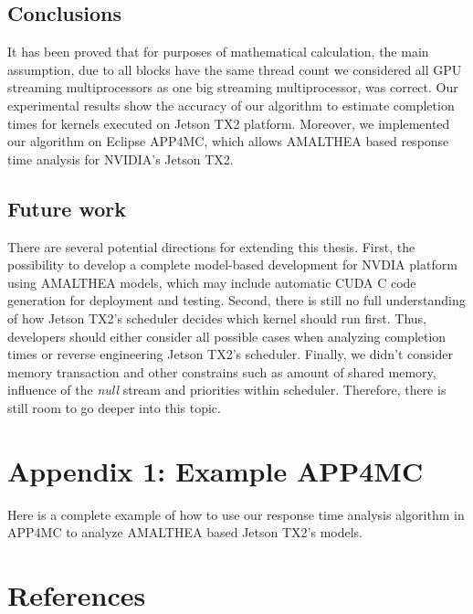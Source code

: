 \documentclass[
  12pt,
  a4paperpaper,
]{report}
\begin{document}
\hypertarget{conclusions}{%
\section{Conclusions}\label{conclusions}}

It has been proved that for purposes of mathematical calculation, the
main assumption, due to all blocks have the same thread count we
considered all GPU streaming multiprocessors as one big streaming
multiprocessor, was correct. Our experimental results show the accuracy
of our algorithm to estimate completion times for kernels executed on
Jetson TX2 platform. Moreover, we implemented our algorithm on Eclipse
APP4MC, which allows AMALTHEA based response time analysis for NVIDIA's
Jetson TX2.

\hypertarget{future-work}{%
\section{Future work}\label{future-work}}

There are several potential directions for extending this thesis. First,
the possibility to develop a complete model-based development for NVDIA
platform using AMALTHEA models, which may include automatic CUDA C code
generation for deployment and testing. Second, there is still no full
understanding of how Jetson TX2's scheduler decides which kernel should
run first. Thus, developers should either consider all possible cases
when analyzing completion times or reverse engineering Jetson TX2's
scheduler. Finally, we didn't consider memory transaction and other
constrains such as amount of shared memory, influence of the \emph{null}
stream and priorities within scheduler. Therefore, there is still room
to go deeper into this topic.

\hypertarget{appendix-1-example-app4mc}{%
\chapter*{Appendix 1: Example APP4MC}\label{appendix-1-example-app4mc}}

Here is a complete example of how to use our response time analysis
algorithm in APP4MC to analyze AMALTHEA based Jetson TX2's models.



\footnotesize

\hypertarget{references}{%
\chapter*{References}\label{references}}
\end{document}
